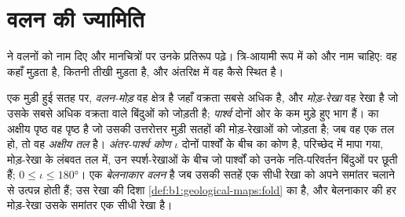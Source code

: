 \section{वलन की ज्यामिति}\label{sec:b1:faults-folds-fabrics:folds}

 ने वलनों को नाम दिए और मानचित्रों पर उनके प्रतिरूप पढ़े। त्रि-आयामी रूप में  को और नाम चाहिए: वह कहाँ मुड़ता है, कितनी तीखी मुड़ता है, और अंतरिक्ष में वह कैसे स्थित है।

\begin{definition}
\label{def:b1:faults-folds-fabrics:fold-elements}
एक मुड़ी हुई सतह पर, \emph{वलन-मोड़} वह क्षेत्र है जहाँ वक्रता सबसे अधिक है, और \emph{मोड़-रेखा} वह रेखा है जो उसके सबसे अधिक वक्रता वाले बिंदुओं को जोड़ती है; \emph{पार्श्व} दोनों ओर के कम मुड़े हुए भाग हैं।  का अक्षीय पृष्ठ वह पृष्ठ है जो उसकी उत्तरोत्तर मुड़ी सतहों की मोड़-रेखाओं को जोड़ता है; जब वह एक तल हो, तो वह \emph{अक्षीय तल} है। \emph{अंतर-पार्श्व कोण} $\iota$ दोनों पार्श्वों के बीच का कोण है, परिच्छेद में मापा गया, मोड़-रेखा के लंबवत तल में, उन स्पर्श-रेखाओं के बीच जो पार्श्वों को उनके नति-परिवर्तन बिंदुओं पर छूती हैं; $0 \le \iota \le \ang{180}$। एक  \emph{बेलनाकार वलन} है जब उसकी सतहें एक सीधी रेखा को अपने समांतर चलाने से उत्पन्न होती हैं; उस रेखा की दिशा \cref{def:b1:geological-maps:fold} का  है, और बेलनाकार  की हर मोड़-रेखा उसके समांतर एक सीधी रेखा है।
\end{definition}

